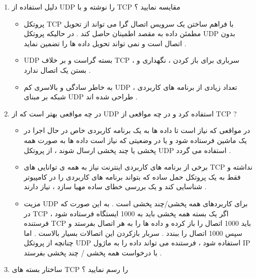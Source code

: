 \documentclass{article}
\begin{document}
\begin{enumerate}
\item دلیل استفاده از UDP را نوشته و با TCP مقایسه نمایید ؟

\begin{tcolorbox}
\begin{itemize}
	\item پروتکل TCP
	با فراهم ساختن یک سرویس اتصال گرا می تواند از تحویل مطمئن داده به مقصد اطمینان حاصل کند . در حالیکه پروتکل
	UDP
	بدون اتصال است و نمی تواند تحویل داده ها را تضمین نماید .
	\item UDP
	بسته گراست و بر خلاف TCP
	، سرباری برای باز کردن ، نگهداری و بستن یک اتصال ندارد .
	\item به خاطر سادگی و بالاسری کم UDP
	، تعداد زیادی از برنامه های کاربردی شبکه بر مبنای UDP
	طراحی شده اند .
\end{itemize}
\end{tcolorbox}


\newpage

\item در چه مواقعی بهتر است که از UDP استفاده کرد و در چه مواقعی از TCP ?

\begin{tcolorbox}
\begin{itemize}
	\item در مواقعی که نیاز است تا داده ها به یک برنامه کاربردی خاص در حال اجرا در یک ماشین فرستاده شود و یا در وضعیتی که نیاز است داده ها به صورت همه پخشی یا چند پخشی ارسال شوند ، از پروتکل UDP 
	استفاده می گردد .
	\item برخی از برنامه های کاربردی اینترنت نیاز به همه ی توانایی های TCP
	نداشته و فقط به یک پروتکل حمل ساده که بتواند برنامه های کاربردی را در کامپیوتر شناسایی کند و یک بررسی خطای ساده مهیا سازد ، نیاز دارند .
	\item مزیت UDP
	برای کاربردهای همه پخشی/چند پخشی است . به این صورت که در TCP
	اگر یک بسته همه پخشی باید به 1000 ایستگاه فرستاده شود ، فرستنده TCP باید 1000 اتصال را باز کرده و داده ها را به هر اتصال بفرستد و سپس 1000 اتصال را ببندد .
	سربار بازکردن این اتصالات بسیار بالاست .
	اما چنانچه از پروتکل UDP استفاده شود ، فرستنده می تواند داده را به ماژول IP با درخواست همه پخشی / چند پخشی بفرستد .
\end{itemize}
\end{tcolorbox}



\newpage

\item ساختار بسته های TCP را رسم نمایید ؟


\end{enumerate}
\end{document}
